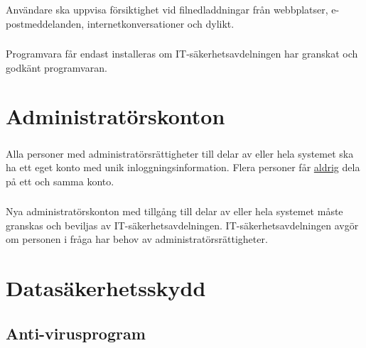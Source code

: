 \documentclass[a4paper,12pt]{article}
\begin{document}
\subsubsection{}

Användare ska uppvisa försiktighet vid filnedladdningar från webbplatser, e-postmeddelanden, internetkonversationer och dylikt.

\subsubsection{}

Programvara får endast installeras om IT-säkerhetsavdelningen har granskat och godkänt programvaran.

\section{Administratörskonton}

\subsubsection{}

Alla personer med administratörsrättigheter till delar av eller hela systemet ska ha ett eget konto med unik inloggningsinformation. Flera personer får \underline{aldrig} dela på ett och samma konto.

\subsubsection{}

Nya administratörskonton med tillgång till delar av eller hela systemet måste granskas och beviljas av IT-säkerhetsavdelningen. IT-säkerhetsavdelningen avgör om personen i fråga har behov av administratörsrättigheter.

\section{Datasäkerhetsskydd}

\subsection{Anti-virusprogram}

\subsubsection{} \label{datasakerhet_antivirus_natverk}
\end{document}
